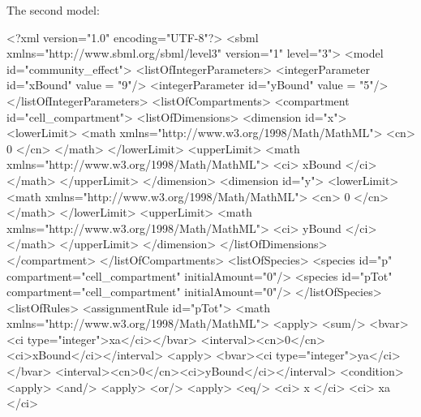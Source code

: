 \documentclass{cekarticle}
\begin{document}
The second model:

\begin{example}
<?xml version="1.0" encoding="UTF-8"?>
<sbml xmlns="http://www.sbml.org/sbml/level3" version="1" level="3">
<model id="community_effect">
    <listOfIntegerParameters>
        <integerParameter id="xBound" value = "9"/>
        <integerParameter id="yBound" value = "5"/>
    </listOfIntegerParameters>
    <listOfCompartments>
        <compartment id="cell_compartment">
            <listOfDimensions>
                <dimension id="x">
                    <lowerLimit>
                        <math xmlns="http://www.w3.org/1998/Math/MathML">
                            <cn> 0 </cn>
                        </math>
                    </lowerLimit>
                    <upperLimit>
                        <math xmlns="http://www.w3.org/1998/Math/MathML">
                            <ci> xBound </ci>
                        </math>
                    </upperLimit>
                </dimension>
                <dimension id="y">
                    <lowerLimit>
                        <math xmlns="http://www.w3.org/1998/Math/MathML">
                            <cn> 0 </cn>
                        </math>
                    </lowerLimit>
                    <upperLimit>
                        <math xmlns="http://www.w3.org/1998/Math/MathML">
                            <ci> yBound </ci>
                        </math>
                    </upperLimit>
                </dimension>
            </listOfDimensions>
        </compartment>
    </listOfCompartments>
    <listOfSpecies>
        <species id="p" compartment="cell_compartment" initialAmount="0"/>
        <species id="pTot" compartment="cell_compartment" initialAmount="0"/>
    </listOfSpecies>
    <listOfRules>
        <assignmentRule id="pTot">
            <math xmlns="http://www.w3.org/1998/Math/MathML">
                <apply>
                    <sum/>
                    <bvar><ci type="integer">xa</ci></bvar>
                    <interval><cn>0</cn><ci>xBound</ci></interval>
                    <apply>
                        <bvar><ci type="integer">ya</ci></bvar>
                        <interval><cn>0</cn><ci>yBound</ci></interval>
                        <condition>
                            <apply>
                                <and/>
                                <apply>
                                    <or/>
                                    <apply>
                                        <eq/>
                                        <ci> x </ci>
                                        <ci> xa </ci>

\end{example}
\end{document}
